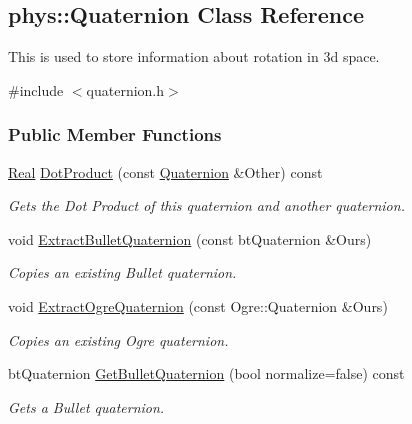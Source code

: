 \hypertarget{classphys_1_1Quaternion}{
\subsection{phys::Quaternion Class Reference}
\label{classphys_1_1Quaternion}
}


This is used to store information about rotation in 3d space.  




{\ttfamily \#include $<$quaternion.h$>$}

\subsubsection*{Public Member Functions}
\begin{DoxyCompactItemize}
\item 
\hyperlink{namespacephys_af7eb897198d265b8e868f45240230d5f}{Real} \hyperlink{classphys_1_1Quaternion_a249938e4221bf91c0853d7ff28b42392}{DotProduct} (const \hyperlink{classphys_1_1Quaternion}{Quaternion} \&Other) const 
\begin{DoxyCompactList}\small\item\em Gets the Dot Product of this quaternion and another quaternion. \item\end{DoxyCompactList}\item 
void \hyperlink{classphys_1_1Quaternion_a10d3582b2731e70279d7bab43173f317}{ExtractBulletQuaternion} (const btQuaternion \&Ours)
\begin{DoxyCompactList}\small\item\em Copies an existing Bullet quaternion. \item\end{DoxyCompactList}\item 
void \hyperlink{classphys_1_1Quaternion_a942fab675a0b124e1dc5e2febab113e6}{ExtractOgreQuaternion} (const Ogre::Quaternion \&Ours)
\begin{DoxyCompactList}\small\item\em Copies an existing Ogre quaternion. \item\end{DoxyCompactList}\item 
btQuaternion \hyperlink{classphys_1_1Quaternion_a053f994770b600ae153a142bb4ba7d33}{GetBulletQuaternion} (bool normalize=false) const 
\begin{DoxyCompactList}\small\item\em Gets a Bullet quaternion. \item\end{DoxyCompactList}\item 

\end{DoxyCompactItemize}
